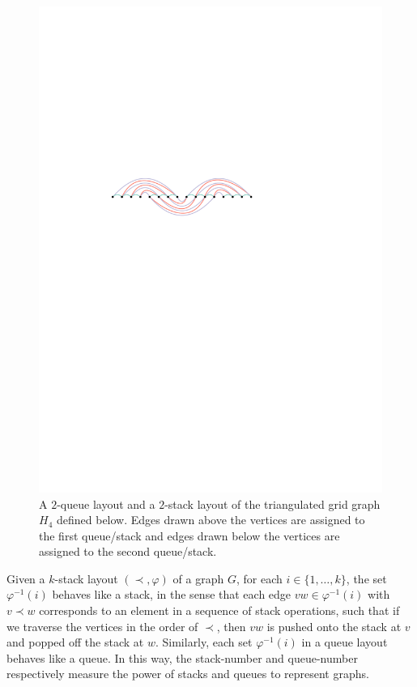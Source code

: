 \documentclass[kpfonts]{patmorin}
\begin{document}
\begin{figure}[H]
	\includegraphics{figs/layouts-2.pdf}
	\caption{A $2$-queue layout and a $2$-stack layout of the triangulated grid graph $H_4$ defined below. Edges drawn above the vertices are assigned to the first queue/stack and edges drawn below the vertices are assigned to the second queue/stack.}
	\label{layouts}
\end{figure}

Given a $k$-stack layout $(\prec,\varphi)$ of a graph $G$, for each $i\in\{1,\dots,k\}$, the set $\varphi^{-1}(i)$ behaves like a stack, in the sense that each edge $vw \in \varphi^{-1}(i)$ with $v\prec w$ corresponds to an element in a sequence of stack operations, such that if we traverse the vertices in the order of $\prec$, then $vw$ is pushed onto the stack at $v$ and popped off the stack at $w$. Similarly, each set $\varphi^{-1}(i)$ in a queue layout  behaves like a queue. In this way, the stack-number and queue-number  respectively measure the power of stacks and queues to represent graphs.
\end{document}
